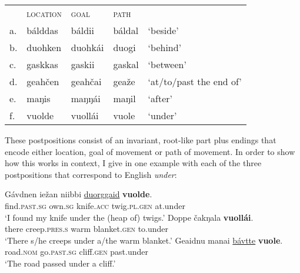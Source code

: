 \documentclass[output=paper]{LSP/langsci}
\begin{document}
\ea%
\label{ex:julien:15}
\begin{tabular}[t]{*{5}{l}}
& \textsc{location}    & \scshape goal  & \scshape path & \\
a.  &  bálddas   &   báldii   &   báldal & ‘beside’                 \\
b.  &  duohken   &   duohkái  &  duogi   & ‘behind’                 \\
c.  &  gaskkas   &   gaskii   & gaskal   & ‘between’                \\
d.  &  geahčen   &   geahčai  &  geaže   & ‘at/to/past the end of’  \\
e.  &  maŋis     &   maŋŋái   & maŋil      & ‘after’                \\
f.  &  vuolde    &   vuollái  &  vuole    & ‘under’                 \\
\end{tabular}
\z

These postpositions consist of an invariant, root-like part plus endings that encode either location, goal of movement or path of movement. In order to show how this works in context, I give in  one example with each of the three postpositions that correspond to English \textit{under}:

\ea%
    \label{ex:julien:16}
\ea
\gll  Gávdnen    iežan      niibbi      \uline{duorggaid}    \textbf{vuolde}.\\
      find.\textsc{past.sg}  own.\textsc{sg}    knife.\textsc{acc}  twig.\textsc{pl.gen}  at.under\\
\glt       ‘I found my knife under the (heap of) twigs.’
\ex
\gll  Doppe  čakŋala             \textbf{vuollái}.\\
    there    creep.\textsc{pres.s}  warm    blanket.\textsc{gen}  to.under\\
\glt       ‘There s/he  creeps under a/the warm blanket.’
\ex
\gll    Geaidnu    manai      \uline{bávtte}    \textbf{vuole}.\\
      road.\textsc{nom}  go.\textsc{past.sg}  cliff.\textsc{gen}   past.under\\
\glt       ‘The road passed under a cliff.’
\z
\z
\end{document}

